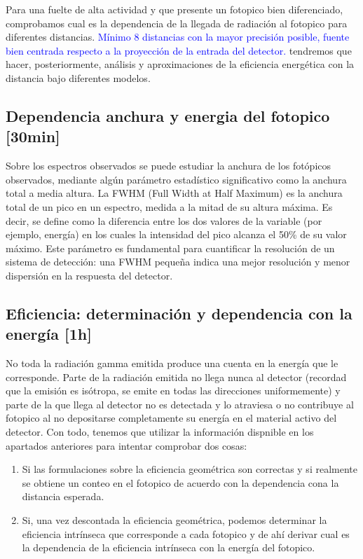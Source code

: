 \documentclass[11pt]{article}
\begin{document}
Para una fuelte de alta actividad y que presente un fotopico bien diferenciado, comprobamos cual es la dependencia de la llegada de radiación al fotopico para diferentes distancias. \textcolor{Blue}{Mínimo 8 distancias con la mayor precisión posible, fuente bien centrada respecto a la proyección de la entrada del detector.} tendremos que hacer, posteriormente, análisis y aproximaciones de la eficiencia energética con la distancia bajo diferentes modelos.

\subsection{Dependencia anchura y energia del fotopico [30min]}

Sobre los espectros observados se puede estudiar la anchura de los fotópicos observados, mediante algún parámetro estadístico significativo como la anchura total a media altura. La FWHM (Full Width at Half Maximum) es la anchura total de un pico en un espectro, medida a la mitad de su altura máxima. Es decir, se define como la diferencia entre los dos valores de la variable (por ejemplo, energía) en los cuales la intensidad del pico alcanza el 50\% de su valor máximo. Este parámetro es fundamental para cuantificar la resolución de un sistema de detección: una FWHM pequeña indica una mejor resolución y menor dispersión en la respuesta del detector.

\subsection{Eficiencia: determinación y dependencia con la energía [1h]}

No toda la radiación gamma emitida produce una cuenta en la energía que le corresponde. Parte de la radiación emitida no llega nunca al detector (recordad que la emisión es isótropa, se emite en todas las direcciones uniformemente) y parte de la que llega al detector no es detectada y lo atraviesa o no contribuye al fotopico al no depositarse completamente su energía en el material activo del detector. Con todo, tenemos que utilizar la información dispnible en los apartados anteriores para intentar comprobar dos cosas:

\begin{enumerate}
    \item Si las formulaciones sobre la eficiencia geométrica son correctas y si realmente se obtiene un conteo en el fotopico de acuerdo con la dependencia cona la distancia esperada.
    \item Si, una vez descontada la eficiencia geométrica, podemos determinar la eficiencia intrínseca que corresponde a cada fotopico y de ahí derivar cual es la dependencia de la eficiencia intrínseca con la energía del fotopico.
\end{enumerate}
\end{document}
